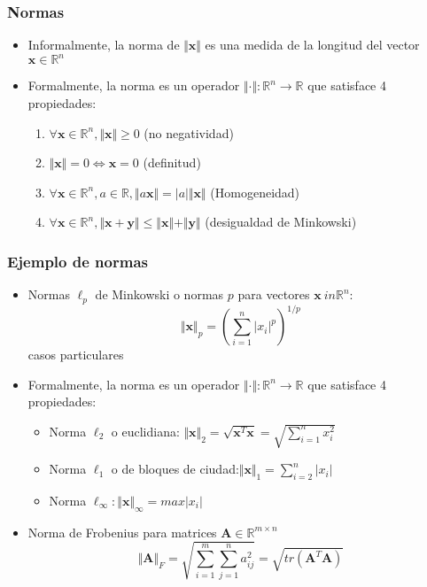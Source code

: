 \documentclass{beamer}
\begin{document}
\begin{frame}
\frametitle{Normas}
\begin{itemize}
\item Informalmente, la norma de $\Vert \boldsymbol{x}\Vert$ es una medida de la longitud del vector $\boldsymbol{x} \in \mathbb{R}^n$
\item Formalmente, la norma es un operador $\Vert \cdot \Vert :\mathbb{R}^n \rightarrow \mathbb{R}$ que satisface 4 propiedades: 
\begin{enumerate}
\item $\forall \boldsymbol{x} \in \mathbb{R}^n, \Vert \boldsymbol{x}\Vert \geq 0$ (no negatividad)
\item  $\Vert \boldsymbol{x}\Vert=0 \Leftrightarrow \boldsymbol{x}=0$ (definitud)
\item $\forall \boldsymbol{x} \in \mathbb{R}^n, a\in \mathbb{R},\Vert a\boldsymbol{x}\Vert = \vert a \vert \Vert \boldsymbol{x}\Vert $ (Homogeneidad)
\item $\forall \boldsymbol{x} \in \mathbb{R}^n,  \Vert \boldsymbol{x+y}\Vert \leq \Vert \boldsymbol{x}\Vert + \Vert \boldsymbol{y}\Vert$ (desigualdad de Minkowski)  
\end{enumerate}

\end{itemize}


\end{frame}
%
\begin{frame}
\frametitle{Ejemplo de normas}
\begin{itemize}
\item Normas $ \ell_{p}$ de Minkowski o normas $p$ para vectores $\boldsymbol{x} \ in \mathbb{R}^n :$
\begin{equation*}
\Vert \boldsymbol{x}\Vert_{p}= \left( \sum_{i=1}^{n} \vert x_{i} \vert^{p} \right)^{1/p} 
\end{equation*}
casos particulares 
\item Formalmente, la norma es un operador $\Vert \cdot \Vert :\mathbb{R}^n \rightarrow \mathbb{R}$ que satisface 4 propiedades: 
\begin{itemize}

\item Norma $\ell_2$ o euclidiana: $\Vert \boldsymbol{x} \Vert_{2}= \sqrt{\boldsymbol{x}^T\boldsymbol{x}}= \sqrt{\sum_{i=1}^{n}x_{i}^2}$
\item Norma $\ell_1$ o de bloques de ciudad:$\Vert \boldsymbol{x} \Vert_{1}= \sum_{i=2}^{n} \vert x_{i}\vert$ 
\item Norma $\ell_\infty : \Vert \boldsymbol{x}\Vert_{\infty}= max \vert x_{i} \vert$   
\end{itemize}
\item Norma de Frobenius para matrices $\boldsymbol{A} \in \mathbb{R}^{m\times n}$
\begin{equation*}
\Vert \boldsymbol{A} \Vert_{F}= \sqrt{\sum_{i=1}^{m} \sum_{j=1}^{n} a_{ij}^{2}}= \sqrt{tr(\boldsymbol{A}^T\boldsymbol{A})}
\end{equation*}
\end{itemize}


\end{frame}
\end{document}

